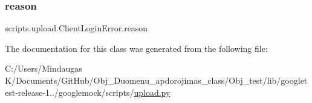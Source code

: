 \subsubsection{\texorpdfstring{reason}{reason}}
{\footnotesize\ttfamily scripts.\+upload.\+Client\+Login\+Error.\+reason}



The documentation for this class was generated from the following file\+:\begin{DoxyCompactItemize}
\item 
C\+:/\+Users/\+Mindaugas K/\+Documents/\+Git\+Hub/\+Obj\+\_\+\+Duomenu\+\_\+apdorojimas\+\_\+class/\+Obj\+\_\+test/lib/googletest-\/release-\/1../googlemock/scripts/\mbox{\hyperlink{_obj__test_2lib_2googletest-release-1_88_81_2googlemock_2scripts_2upload_8py}{upload.\+py}}\end{DoxyCompactItemize}

